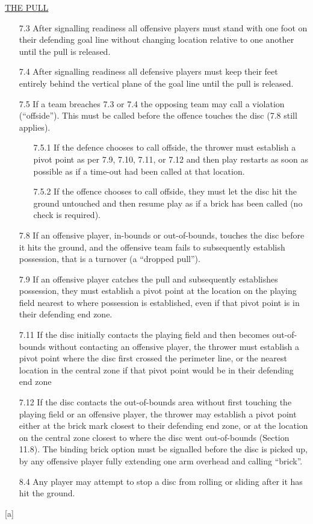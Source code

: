 \small
\underline{\uppercase{the pull}}
\begin{itemize}
    \item [7.3] After signalling readiness all offensive players must stand with one foot on their defending goal line without changing location relative to one another until the pull is released.
    \item [7.4] After signalling readiness all defensive players must keep their feet entirely behind the vertical plane of the goal line until the pull is released.
    \item [7.5] If a team breaches 7.3 or 7.4 the opposing team may call a violation (“offside”). This must be called before the offence touches the disc (7.8 still applies).
        \begin{itemize}
            \item[7.5.1] If the defence chooses to call offside, the thrower must establish a pivot point as per 7.9, 7.10, 7.11, or 7.12 and then play restarts as soon as possible as if a time-out had been called at that location.
            \item[7.5.2] If the offence chooses to call offside, they must let the disc hit the ground untouched and then resume play as if a brick has been called (no check is required).
        \end{itemize}
    \item[7.8] If an offensive player, in-bounds or out-of-bounds, touches the disc before it hits the ground, and the offensive team fails to subsequently establish possession, that is a turnover (a “dropped pull”).
    \item[7.9] If an offensive player catches the pull and subsequently establishes possession, they must establish a pivot point at the location on the playing field nearest to where possession is established, even if that pivot point is in their defending end zone.
    \item[7.11] If the disc initially contacts the playing field and then becomes out-of-bounds without contacting an offensive player, the thrower must establish a pivot point where the disc first crossed the perimeter line, or the nearest location in the central zone if that pivot point would be in their defending end zone
    \item[7.12] If the disc contacts the out-of-bounds area without first touching the playing field or an offensive player, the thrower may establish a pivot point either at the brick mark closest to their defending end zone, or at the location on the central zone closest to where the disc went out-of-bounds (Section 11.8). The binding brick option must be signalled before the disc is picked up, by any offensive player fully extending one arm overhead and calling “brick”.
    \item[8.4] Any player may attempt to stop a disc from rolling or sliding after it has hit the ground.
\end{itemize}
\begin{center}[a]\end{center}
